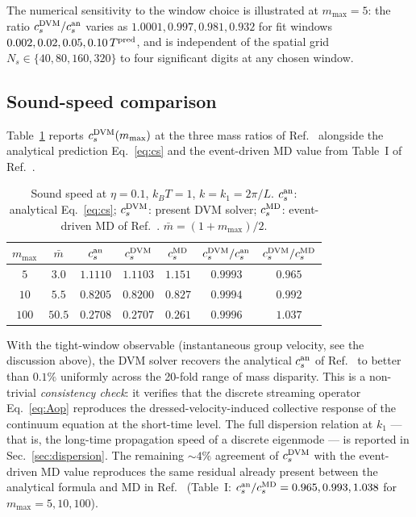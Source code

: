 \documentclass[aps,pre,twocolumn,superscriptaddress,longbibliography,floatfix]{revtex4-2}
\begin{document}
The numerical sensitivity to the window choice is
illustrated at $m_{\max}=5$: the ratio
$c_s^{\rm DVM}/c_s^{\rm an}$ varies as
$1.0001, 0.997, 0.981, 0.932$ for fit windows
$0.002, 0.02, 0.05, 0.10\,T^{\rm pred}$, and is independent
of the spatial grid $N_s\in\{40,80,160,320\}$ to four
significant digits at any chosen window.

\subsection{Sound-speed comparison}

Table~\ref{tab:cs} reports $c_s^{\rm DVM}(m_{\max})$ at the
three mass ratios of Ref.~\cite{PaperII} alongside the
analytical prediction Eq.~\eqref{eq:cs} and the event-driven
MD value from Table~I of Ref.~\cite{PaperIV}.
\begin{table}[htbp]
\caption{Sound speed at $\eta=0.1$, $k_BT=1$, $k=k_1=2\pi/L$.
$c_s^{\rm an}$: analytical Eq.~\eqref{eq:cs};
$c_s^{\rm DVM}$: present DVM solver;
$c_s^{\rm MD}$: event-driven MD of Ref.~\cite{PaperIV}.
$\bar m=(1+m_{\max})/2$.}
\label{tab:cs}
\centering
\begin{tabular}{c|cccc|cc}
\hline\hline
$m_{\max}$ & $\bar m$ & $c_s^{\rm an}$ & $c_s^{\rm DVM}$
& $c_s^{\rm MD}$
& $c_s^{\rm DVM}/c_s^{\rm an}$
& $c_s^{\rm DVM}/c_s^{\rm MD}$ \\
\hline
$5$   & $3.0$  & $1.1110$ & $1.1103$ & $1.151$ & $0.9993$ & $0.965$\\
$10$  & $5.5$  & $0.8205$ & $0.8200$ & $0.827$ & $0.9994$ & $0.992$\\
$100$ & $50.5$ & $0.2708$ & $0.2707$ & $0.261$ & $0.9996$ & $1.037$\\
\hline\hline
\end{tabular}
\end{table}

With the tight-window observable (instantaneous group
velocity, see the discussion above), the DVM solver recovers
the analytical $c_s^{\rm an}$ of Ref.~\cite{PaperIV} to
better than $0.1\%$ uniformly across the 20-fold range of
mass disparity. This is a non-trivial \emph{consistency
check}: it verifies that the discrete streaming operator
Eq.~\eqref{eq:Aop} reproduces the dressed-velocity-induced
collective response of the continuum equation at the
short-time level. The full dispersion relation at $k_1$ ---
that is, the long-time propagation speed of a discrete
eigenmode --- is reported in Sec.~\ref{sec:dispersion}. The
remaining $\sim 4\%$ agreement of $c_s^{\rm DVM}$ with the
event-driven MD value reproduces the same residual already
present between the analytical formula and MD in
Ref.~\cite{PaperIV} (Table~I:
$c_s^{\rm an}/c_s^{\rm MD}=0.965, 0.993, 1.038$ for
$m_{\max}=5,10,100$).
\end{document}
